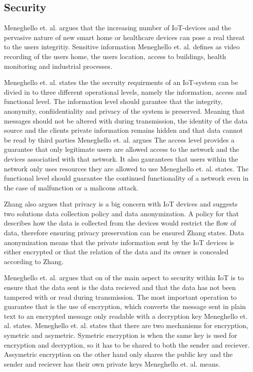 \subsection{Security}
Meneghello et. al. argues that the increasing number of IoT-devices and the pervasive nature of new smart home or healthcare devices can pose a real threat to the users integritiy.
Sensitive information Meneghello et. al. defines as video recording of the users home, the users location, access to buildings, health monitoring and industrial processes. \cite{Meneghello2019}

Meneghello et. al. states the the secruity requirments of an IoT-system can be divied in to three different operational levels, namely the information, access and functional level. \cite{Meneghello2019}
The information level should garantee that the integrity, anonymity, confiidentiality and privacy of the system is preserved. 
Meaning that messages should not be altered with during transmission, the identity of the data source and the clients private information remains hidden and that data cannot be read by third parties Meneghello et. al. argues \cite{Meneghello2019} 
The access level provides a guarantee that only legitimate users are allowed access to the network and the devices associatied with that network. 
It also gaurantees that users within the network only uses resources they are allowed to use Meneghello et. al. states. \cite{Meneghello2019}
The functional level should guarantee the continued functionality of a network even in the case of malfunction or a malicous attack.

Zhang also argues that privacy is a big concern with IoT devices and suggests two solutions data collection policy and data anonymization. \cite{Zhang2014}
A policy for that describes how the data is collected from the devices would restrict the flow of data, therefore ensuring privacy preservation can be ensured Zhang states. \cite{Zhang2014}
Data anonymization means that the private information sent by the IoT devices is either encrypted or that the relation of the data and its owner is concealed according to Zhang. \cite{Zhang2014}

Meneghello et. al. argues that on of the main aspect to security within IoT is to ensure that the data sent is the data recieved and that the data has not been tampered with or read during transmission.
The most important operation to guarantee that is the use of encryption, which converts the message sent in plain text to an encrypted message only readable with a decryption key Meneghello et. al. states. \cite{Meneghello2019}
Meneghello et. al. states that there are two mechanisms for encryption, symetric and asymetric. 
Symetric encryption is when the same key is used for encryption and decryption, so it has to be shared to both the sender and reciever.
Assymetric encryption on the other hand only shares the public key and the sender and reciever has their own private keys Meneghello et. al. means.

